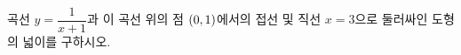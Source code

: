 곡선 $y=\dfrac{1}{x+1}$과 이 곡선 위의 점 $(0{,}\mkern3mu\mathopen{}1)$에서의 접선 및 직선 $x=3$으로 둘러싸인 도형의 넓이를 구하시오.

